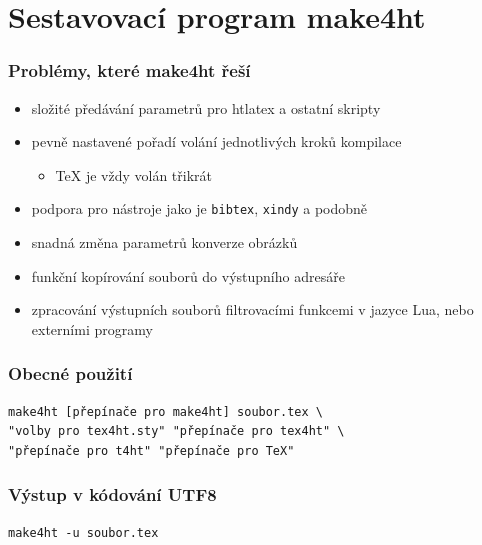 \section{Sestavovací program make4ht}
\begin{frame}
  \frametitle{Problémy, které make4ht řeší} 
  \begin{itemize}
    \item složité předávání parametrů pro htlatex a ostatní skripty
    \item pevně nastavené pořadí volání jednotlivých kroků kompilace
      \begin{itemize}
        \item TeX je vždy volán třikrát
      \end{itemize}
    \item podpora pro nástroje jako je \texttt{bibtex}, \texttt{xindy} a podobně
    \item  snadná změna parametrů konverze obrázků
    \item funkční kopírování souborů do výstupního adresáře
    \item zpracování výstupních souborů filtrovacími funkcemi v jazyce Lua, nebo externími
      programy
  \end{itemize}
\end{frame}
\begin{frame}[fragile]
  \frametitle{Obecné použití}
      \begin{priklad}
        \small
\begin{verbatim}
make4ht [přepínače pro make4ht] soubor.tex \ 
"volby pro tex4ht.sty" "přepínače pro tex4ht" \
"přepínače pro t4ht" "přepínače pro TeX"
\end{verbatim}
      \end{priklad}
\end{frame}

\begin{frame}[fragile]
  \frametitle{Výstup v kódování  UTF8}
      \begin{priklad}
\begin{verbatim}
make4ht -u soubor.tex
\end{verbatim}
\end{priklad}

\end{frame}



